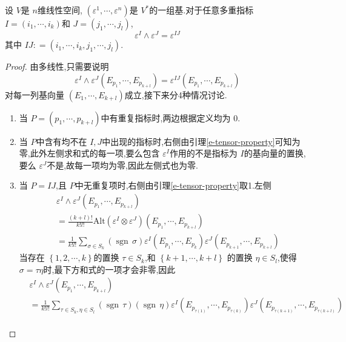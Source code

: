 \documentclass[../../几何与拓扑.tex]{subfiles}
\begin{document}
\begin{lemma}\label{e-wedge-lemma}
    设 $ V $是 $ n $维线性空间, $ \left(  \varepsilon ^{1},\cdots , \varepsilon ^{n} \right)  $是 $ V^{*} $的一组基.对于任意多重指标  $ I = \left( i_1,\cdots ,i_{k} \right)  $和 $ J= \left( j_1,\cdots,j_{l} \right)  $,  $$
     \varepsilon ^{I} \wedge \varepsilon^{J} = \varepsilon^{IJ}
    $$其中 $ IJ: = \left( i_1,\cdots ,i_{k},j_1,\cdots ,j_{l} \right)  $.  
\end{lemma}
\begin{proof}
    由多线性,只需要说明 $$
     \varepsilon ^{I}\wedge  \varepsilon ^{J} \left( E_{p_1},\cdots ,E_{p_{k+ l}} \right) =  \varepsilon ^{IJ}\left( E_{p_1},\cdots ,E_{p_{k+ l}} \right)  
    $$对每一列基向量 $ \left( E_1,\cdots ,E_{k+ l} \right)  $成立,接下来分4种情况讨论.
    \begin{enumerate}
        \item 当 $ P = \left( p_1,\cdots ,p_{k+ l} \right) $中有重复指标时,两边根据定义均为 $ 0 $.
        \item 当 $ P $中含有均不在 $I,J $中出现的指标时,右侧由引理\ref{e-tensor-property}可知为零,此外左侧求和式的每一项,要么包含 $  \varepsilon ^{I} $作用的不是指标为 $ I $的基向量的置换,要么 $  \varepsilon ^{J} $不是,故每一项均为零,因此左侧式也为零.
        \item 当 $ P =IJ $,且 $ P $中无重复项时,右侧由引理\ref{e-tensor-property}取1.左侧 $$
        \begin{aligned}
         &\varepsilon ^{I} \wedge  \varepsilon ^{J}\left( E_{p_1},\cdots ,E_{p_{k+ l}} \right)\\ 
            & = \frac{\left( k+ l \right)!  }{k!l! } \mathrm{Alt}\left(  \varepsilon ^{I}\otimes  \varepsilon ^{J} \right)\left( E_{p_1},\cdots ,E_{p_{k+ l}} \right)   \\ 
            & =  \frac{1}{k!l!} \sum_{\sigma \in S_{k}} \left( \operatorname{sgn}\,\sigma \right)  \varepsilon ^{I}\left( E_{p_1},\cdots ,E_{p_{k}} \right) \varepsilon ^{J}\left( E_{p_{k+ 1}},\cdots ,E_{p_{k+ l}} \right)   
        \end{aligned}
        $$  当存在 $ \left\{  1,2,\cdots,k \right\} $的置换 $ \tau \in S_{k} $,和 $ \left\{ k+ 1,\cdots ,k+ l \right\} $ 的置换 $ \eta \in S_{l} $,使得 $ \sigma = \tau\eta $时,最下方和式的一项才会非零,因此 $$
        \begin{aligned}
         & \varepsilon ^{I}\wedge  \varepsilon ^{J}\left( E_{p_1},\cdots ,E_{p_{k+ l}} \right)  \\ 
          & = \frac{1}{k!l!} \sum_{\tau \in S_{k},\eta \in S_{l}} \left( \operatorname{sgn}\,\tau \right)\left( \operatorname{sgn}\,\eta \right)   \varepsilon ^{I}\left( E_{p_{\tau\left( 1 \right) }},\cdots ,E_{p_{\tau\left( k \right) }} \right)  \varepsilon ^{J}\left( E_{p_{\tau\left( k+ 1 \right) }} ,\cdots , E_{p_{\tau\left( k+ l \right) }}\right)\\ 

\end{aligned}$$
\end{enumerate}
\end{proof}
\end{document}
